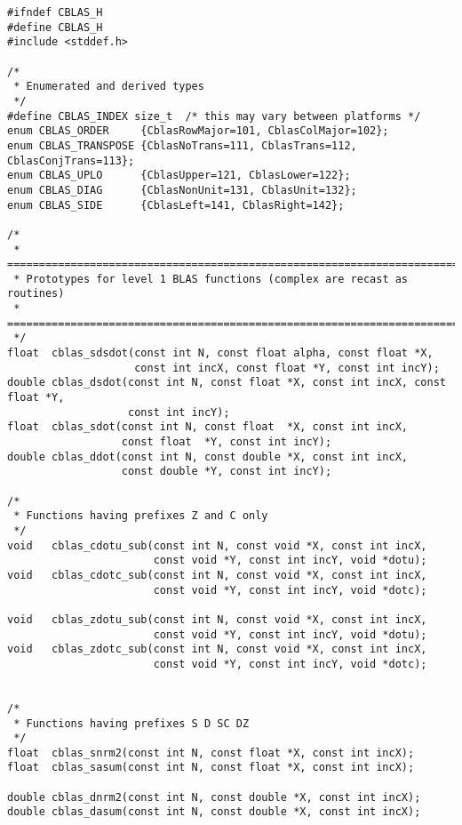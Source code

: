 \documentclass{article}
\begin{document}

\begin{Verbatim}[fontsize=\small,fontfamily=tt,fontshape=rm]
#ifndef CBLAS_H
#define CBLAS_H
#include <stddef.h>

/*
 * Enumerated and derived types
 */
#define CBLAS_INDEX size_t  /* this may vary between platforms */
enum CBLAS_ORDER     {CblasRowMajor=101, CblasColMajor=102};
enum CBLAS_TRANSPOSE {CblasNoTrans=111, CblasTrans=112, CblasConjTrans=113};
enum CBLAS_UPLO      {CblasUpper=121, CblasLower=122};
enum CBLAS_DIAG      {CblasNonUnit=131, CblasUnit=132};
enum CBLAS_SIDE      {CblasLeft=141, CblasRight=142};

/*
 * ===========================================================================
 * Prototypes for level 1 BLAS functions (complex are recast as routines)
 * ===========================================================================
 */
float  cblas_sdsdot(const int N, const float alpha, const float *X,
                    const int incX, const float *Y, const int incY);
double cblas_dsdot(const int N, const float *X, const int incX, const float *Y,
                   const int incY);
float  cblas_sdot(const int N, const float  *X, const int incX,
                  const float  *Y, const int incY);
double cblas_ddot(const int N, const double *X, const int incX,
                  const double *Y, const int incY);

/*
 * Functions having prefixes Z and C only
 */
void   cblas_cdotu_sub(const int N, const void *X, const int incX,
                       const void *Y, const int incY, void *dotu);
void   cblas_cdotc_sub(const int N, const void *X, const int incX,
                       const void *Y, const int incY, void *dotc);

void   cblas_zdotu_sub(const int N, const void *X, const int incX,
                       const void *Y, const int incY, void *dotu);
void   cblas_zdotc_sub(const int N, const void *X, const int incX,
                       const void *Y, const int incY, void *dotc);


/*
 * Functions having prefixes S D SC DZ
 */
float  cblas_snrm2(const int N, const float *X, const int incX);
float  cblas_sasum(const int N, const float *X, const int incX);

double cblas_dnrm2(const int N, const double *X, const int incX);
double cblas_dasum(const int N, const double *X, const int incX);


\end{Verbatim}
\end{document}
